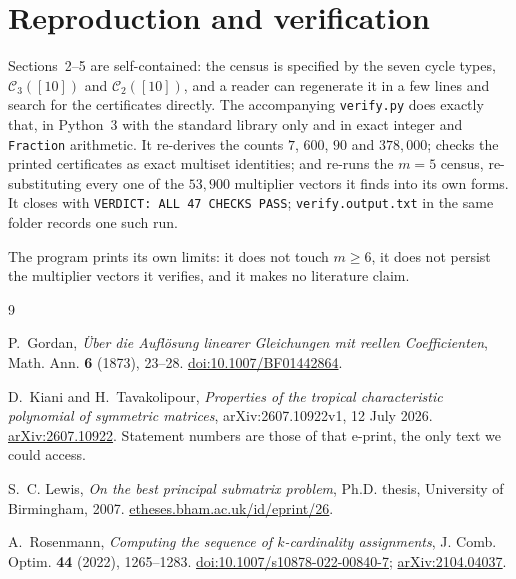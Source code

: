 \documentclass[11pt]{amsart}
\newcommand{\Cov}{\mathcal C}
\begin{document}
\section{Reproduction and verification}

Sections~2--5 are self-contained: the census is specified by the seven cycle
types, $\Cov_3([10])$ and $\Cov_2([10])$, and a reader can regenerate it in a
few lines and search for the certificates directly. The accompanying
\texttt{verify.py} does exactly that, in Python~3 with the standard library only
and in exact integer and \texttt{Fraction} arithmetic. It re-derives the counts
$7$, $600$, $90$ and $378{,}000$; checks the printed certificates as exact
multiset identities; and re-runs the $m=5$ census, re-substituting every one of
the $53{,}900$ multiplier vectors it finds into its own forms. It closes with
\texttt{VERDICT: ALL 47 CHECKS PASS}; \texttt{verify.output.txt} in the same
folder records one such run.

The program prints its own limits: it does not touch $m\ge6$, it does not
persist the multiplier vectors it verifies, and it makes no literature claim.

\begin{thebibliography}{9}

P.~Gordan,
\emph{\"Uber die Aufl\"osung linearer Gleichungen mit reellen Coefficienten},
Math. Ann. \textbf{6} (1873), 23--28.
\href{https://doi.org/10.1007/BF01442864}{doi:10.1007/BF01442864}.

D.~Kiani and H.~Tavakolipour,
\emph{Properties of the tropical characteristic polynomial of symmetric
matrices},
arXiv:2607.10922v1, 12 July 2026.
\href{https://arxiv.org/abs/2607.10922}{arXiv:2607.10922}.
Statement numbers are those of that e-print, the only text we could access.

S.~C. Lewis,
\emph{On the best principal submatrix problem},
Ph.D. thesis, University of Birmingham, 2007.
\href{https://etheses.bham.ac.uk/id/eprint/26}{etheses.bham.ac.uk/id/eprint/26}.

A.~Rosenmann,
\emph{Computing the sequence of $k$-cardinality assignments},
J. Comb. Optim. \textbf{44} (2022), 1265--1283.
\href{https://doi.org/10.1007/s10878-022-00840-7}{doi:10.1007/s10878-022-00840-7};
\href{https://arxiv.org/abs/2104.04037}{arXiv:2104.04037}.

\end{thebibliography}
\end{document}
